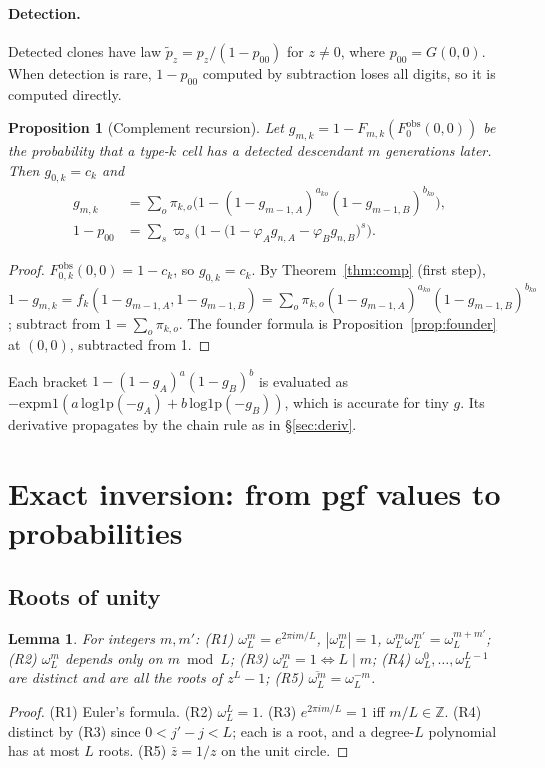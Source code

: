 \documentclass[11pt]{article}
\newtheorem{lemma}[theorem]{Lemma}
\newtheorem{proposition}[theorem]{Proposition}
\theoremstyle{definition}
\theoremstyle{remark}
\begin{document}
\paragraph{Detection.} Detected clones have law $\tilde p_z=p_z/(1-p_{00})$ for $z\ne0$, where $p_{00}=G(0,0)$. When detection is rare, $1-p_{00}$ computed by subtraction loses all digits, so it is computed directly.
\begin{proposition}[Complement recursion]\label{prop:detect}
Let $g_{m,k}=1-F_{m,k}(F^{\mathrm{obs}}_0(0,0))$ be the probability that a type-$k$ cell has a detected descendant $m$ generations later. Then $g_{0,k}=c_k$ and
\begin{align*}
g_{m,k}&=\sum_o\pi_{k,o}\Big(1-(1-g_{m-1,A})^{a_{ko}}(1-g_{m-1,B})^{b_{ko}}\Big),\\
1-p_{00}&=\sum_s\varpi_s\Big(1-\big(1-\varphi_Ag_{n,A}-\varphi_Bg_{n,B}\big)^s\Big).
\end{align*}
\end{proposition}
\begin{proof}
$F^{\mathrm{obs}}_{0,k}(0,0)=1-c_k$, so $g_{0,k}=c_k$. By Theorem~\ref{thm:comp} (first step), $1-g_{m,k}=f_k(1-g_{m-1,A},1-g_{m-1,B})=\sum_o\pi_{k,o}(1-g_{m-1,A})^{a_{ko}}(1-g_{m-1,B})^{b_{ko}}$; subtract from $1=\sum_o\pi_{k,o}$. The founder formula is Proposition~\ref{prop:founder} at $(0,0)$, subtracted from 1.
\end{proof}
\noindent Each bracket $1-(1-g_A)^a(1-g_B)^b$ is evaluated as $-\mathrm{expm1}(a\,\mathrm{log1p}(-g_A)+b\,\mathrm{log1p}(-g_B))$, which is accurate for tiny $g$. Its derivative propagates by the chain rule as in \S\ref{sec:deriv}.

\section{Exact inversion: from pgf values to probabilities}\label{sec:inversion}
\subsection{Roots of unity}
\begin{lemma}\label{lem:roots}
For integers $m,m'$: (R1) $\omega_L^m=e^{2\pi im/L}$, $|\omega_L^m|=1$, $\omega_L^m\omega_L^{m'}=\omega_L^{m+m'}$; (R2) $\omega_L^m$ depends only on $m\bmod L$; (R3) $\omega_L^m=1\iff L\mid m$; (R4) $\omega_L^0,\dots,\omega_L^{L-1}$ are distinct and are all the roots of $z^L-1$; (R5) $\overline{\omega_L^m}=\omega_L^{-m}$.
\end{lemma}
\begin{proof}
(R1) Euler's formula. (R2) $\omega_L^L=1$. (R3) $e^{2\pi im/L}=1$ iff $m/L\in\mathbb Z$. (R4) distinct by (R3) since $0<j'-j<L$; each is a root, and a degree-$L$ polynomial has at most $L$ roots. (R5) $\bar z=1/z$ on the unit circle.
\end{proof}
\end{document}
